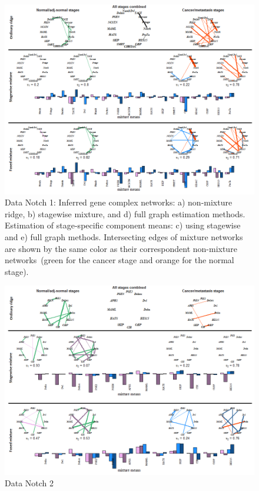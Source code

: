 \documentclass[10pt]{article}
\begin{document}
\newpage
\begin{figure}
\begin{center}
 \includegraphics[scale=.8]{notch1.png}
\end{center}
\caption{ Data Notch 1:  Inferred gene complex networks: a) non-mixture ridge, b) stagewise mixture, and d) full graph estimation methods. Estimation of stage-specific component means: c) using stagewise and e) full graph methods. Intersecting edges of mixture networks are shown by the same color as their correspondent non-mixture networks~(green for the cancer stage and orange for the normal stage).}
\label{fig:notch1}
\end{figure}

\newpage
\begin{figure}
\begin{center}
 \includegraphics[scale=.8]{notch2.png}
\end{center}
\caption{ Data Notch 2}
\label{fig:notch2}
\end{figure}
\end{document}
